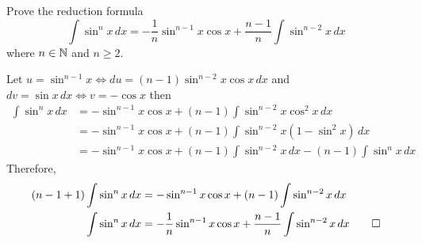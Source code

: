 \begin{problem}
    Prove the reduction formula
    \[\int\sin^n x\,dx
    =-\frac{1}{n}\sin^{n-1}x\cos x+\frac{n-1}{n}\int\sin^{n-2}x\,dx\]
    where \(n\in\mathbb{N}\) and \(n\geq 2\).
\end{problem}
\begin{solution}
    Let \(u=\sin^{n-1}x\iff du=(n-1)\sin^{n-2}x\cos x\,dx\) and
    \(dv=\sin x\,dx\iff v=-\cos x\) then
    \begin{align*}
        \int\sin^n x\,dx
        &= -\sin^{n-1}x\cos x+(n-1)\int \sin^{n-2}x\cos^2 x\,dx \\
        &= -\sin^{n-1}x\cos x+(n-1)\int \sin^{n-2}x(1-\sin^2 x)\,dx \\
        &= -\sin^{n-1}x\cos x+(n-1)\int \sin^{n-2}x\,dx-(n-1)\int\sin^n x\,dx
    \end{align*}
    Therefore,
    \begin{align*}
        (n-1+1)\int\sin^n x\,dx &= -\sin^{n-1}x\cos x+(n-1)\int \sin^{n-2}x\,dx \\
        \int\sin^n x\,dx
        &= -\frac{1}{n}\sin^{n-1}x\cos x+\frac{n-1}{n}\int\sin^{n-2}x\,dx \qedhere
    \end{align*}
\end{solution}